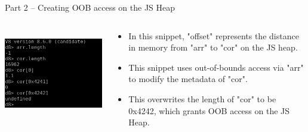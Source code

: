 \begin{frame}{Part 2 -- Creating OOB access on the JS Heap}
    \begin{columns}
        \begin{column}{0.5\textwidth}
            \inputminted[]{js}{code/exploit-2.tex}
            \includegraphics[width=\textwidth]{images/v8-length-screenshot.png}
        \end{column}
        \begin{column}{0.5\textwidth}
            \begin{itemize}
                \item In this snippet, "offset" represents the distance in memory from "arr" to "cor" on the JS heap. 
                \item This snippet uses out-of-bounds access via "arr" to modify the metadata of "cor".
                \item This overwrites the length of "cor" to be 0x4242, which grants OOB access on the JS Heap. 
            \end{itemize}
        \end{column}
    \end{columns}
\end{frame}

